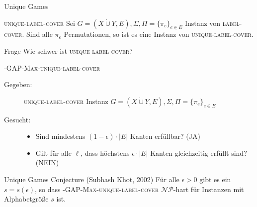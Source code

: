 \documentclass[table,german,10pt]{beamer}
\DeclareMathOperator{\twoponer}{2P1R}
\newcommand{\blue}[1]{\textcolor{blue}{#1}}
\newcommand{\green}[1]{\textcolor{green!50!black}{#1}}
\begin{document}
\begin{frame}{Unique Games}
  \begin{block}{\textsc{unique-label-cover}}
      Sei $G=(X\dot{\cup}Y,E),\Sigma,\Pi=\{\pi_{e}\}_{e\in E}$ Instanz
      von \textsc{label-cover}. Sind alle $\pi_{e}$ Permutationen, so
      ist es eine Instanz von \textsc{unique-label-cover}. 
  \end{block}
  \pause
  \begin{block}{Frage}
    Wie schwer ist \textsc{unique-label-cover}?
  \end{block}
  \pause
  \begin{block}{\textsc{\epsilon-GAP-Max-unique-label-cover}}
    \begin{description}
    \item[Gegeben:] \textsc{unique-label-cover} Instanz
      $G=(X\dot{\cup}Y,E),\Sigma,\Pi=\{\pi_{e}\}_{e\in E}$
    \item[Gesucht:] 
      \begin{itemize}
      \item Sind mindestens $(1-\epsilon)\cdot |E|$ Kanten erfüllbar? (JA)
      \item Gilt für alle $\ell$, dass höchstens $\epsilon\cdot |E|$
        Kanten gleichzeitig erfüllt sind? (NEIN)
      \end{itemize}
    \end{description}
  \end{block}
  \pause
  \begin{block}{Unique Games Conjecture (Subhash Khot, 2002)}
    Für alle $\epsilon>0$ gibt es ein $s=s(\epsilon)$, so dass
    \textsc{\epsilon-GAP-Max-unique-label-cover} $\mathcal{NP}$-hart für
    Instanzen mit Alphabetgröße $s$ ist. 
    
  \end{block}
  
\end{frame}
\end{document}
